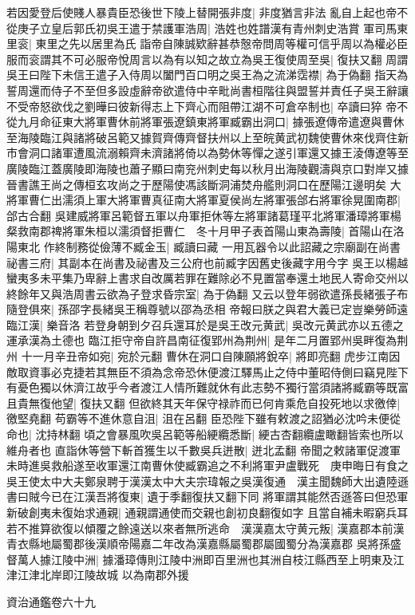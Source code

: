 若因愛登后使賤人暴貴臣恐後世下陵上替開張非度|{
	非度猶言非法}
亂自上起也帝不從庚子立皇后郭氏初吳王遣于禁護軍浩周|{
	浩姓也姓譜漢有青州刺史浩賞}
軍司馬東里衮|{
	東里之先以居里為氏}
詣帝自陳誠欵辭甚恭慤帝問周等權可信乎周以為權必臣服而衮謂其不可必服帝悅周言以為有以知之故立為吳王復使周至吳|{
	復扶又翻}
周謂吳王曰陛下未信王遣子入侍周以闔門百口明之吳王為之流涕霑襟|{
	為于偽翻}
指天為誓周還而侍子不至但多設虛辭帝欲遣侍中辛毗尚書桓階往與盟誓并責任子吳王辭讓不受帝怒欲伐之劉曄曰彼新得志上下齊心而阻帶江湖不可倉卒制也|{
	卒讀曰猝}
帝不從九月命征東大將軍曹休前將軍張遼鎮東將軍臧霸出洞口|{
	據張遼傳帝遣遼與曹休至海陵臨江與諸將破呂範又據賀齊傳齊督扶州以上至皖黄武初魏使曹休來伐齊住新市會洞口諸軍遭風流溺賴齊未濟諸將倚以為勢休等憚之遂引軍還又據王淩傳遼等至廣陵臨江蓋廣陵即海陵也蕭子顯曰南兖州刺史每以秋月出海陵觀濤與京口對岸又據晉書譙王尚之傳桓玄攻尚之于歷陽使馮該斷洞浦焚舟艦則洞口在歷陽江邊明矣}
大將軍曹仁出濡須上軍大將軍曹真征南大將軍夏侯尚左將軍張郃右將軍徐晃圍南郡|{
	郃古合翻}
吳建威將軍呂範督五軍以舟軍拒休等左將軍諸葛瑾平北將軍潘璋將軍楊粲救南郡禆將軍朱桓以濡須督拒曹仁　冬十月甲子表首陽山東為壽陵|{
	首陽山在洛陽東北}
作終制務從儉薄不臧金玉|{
	臧讀曰藏}
一用瓦器令以此詔藏之宗廟副在尚書祕書三府|{
	其副本在尚書及祕書及三公府也前臧字因舊史後藏字用今字}
吳王以楊越蠻夷多未平集乃卑辭上書求自改厲若罪在難除必不見置當奉還土地民人寄命交州以終餘年又與浩周書云欲為子登求昏宗室|{
	為于偽翻}
又云以登年弱欲遣孫長緒張子布隨登俱來|{
	孫邵字長緒吳王稱尊號以邵為丞相}
帝報曰朕之與君大義已定豈樂勞師遠臨江漢|{
	樂音洛}
若登身朝到夕召兵還耳於是吳王改元黄武|{
	吳改元黄武亦以五德之運承漢為土德也}
臨江拒守帝自許昌南征復郢州為荆州|{
	是年二月置郢州吳畔復為荆州}
十一月辛丑帝如宛|{
	宛於元翻}
曹休在洞口自陳願將銳卒|{
	將即亮翻}
虎步江南因敵取資事必克捷若其無臣不須為念帝恐休便渡江驛馬止之侍中董昭侍側曰竊見陛下有憂色獨以休濟江故乎今者渡江人情所難就休有此志勢不獨行當須諸將臧霸等既富且貴無復他望|{
	復扶又翻}
但欲終其天年保守禄祚而已何肯乘危自投死地以求徼倖|{
	徼堅堯翻}
苟霸等不進休意自沮|{
	沮在呂翻}
臣恐陛下雖有敕渡之詔猶必沈吟未便從命也|{
	沈持林翻}
頃之會暴風吹吳呂範等船綆纜悉斷|{
	綆古杏翻纜盧瞰翻皆索也所以維舟者也}
直詣休等營下斬首獲生以千數吳兵迸散|{
	迸北孟翻}
帝聞之敕諸軍促渡軍未時進吳救船遂至收軍還江南曹休使臧霸追之不利將軍尹盧戰死　庚申晦日有食之　吳王使太中大夫鄭泉聘于漢漢太中大夫宗瑋報之吳漢復通　漢主聞魏師大出遺陸遜書曰賊今已在江漢吾將復東|{
	遺于季翻復扶又翻下同}
將軍謂其能然否遜答曰但恐軍新破創夷未復始求通親|{
	通親謂通使而交親也創初良翻復如字}
且當自補未暇窮兵耳若不推算欲復以傾覆之餘遠送以來者無所逃命　漢漢嘉太守黄元叛|{
	漢嘉郡本前漢青衣縣地屬蜀郡後漢順帝陽嘉二年改為漢嘉縣屬蜀郡屬國蜀分為漢嘉郡}
吳將孫盛督萬人據江陵中洲|{
	據潘璋傳則江陵中洲即百里洲也其洲自枝江縣西至上明東及江津江津北岸即江陵故城}
以為南郡外援

資治通鑑卷六十九
